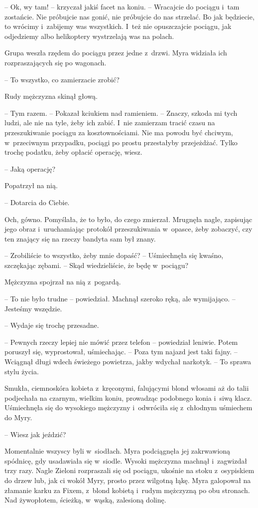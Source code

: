 \documentclass[oneside,polish,11pt,sfheadings]{mwbk}
\begin{document}
-- Ok, wy tam! -- krzyczał jakiś facet na koniu. -- Wracajcie do pociągu i~tam zostańcie. Nie próbujcie nas gonić, nie próbujcie do nas strzelać.
Bo jak będziecie, to wrócimy i~zabijemy was wszystkich. I~też nie
opuszczajcie pociągu, jak odjedziemy albo helikoptery wystrzelają was na
polach.

Grupa weszła rzędem do pociągu przez jedne z~drzwi. Myra widziała ich
rozpraszających się po wagonach.

-- To wszystko, co zamierzacie zrobić?

Rudy mężczyzna skinął głową. 

-- Tym razem. -- Pokazał kciukiem nad
ramieniem. -- Znaczy, szkoda mi tych ludzi, ale nie na tyle, żeby ich
zabić. I~nie zamierzam tracić czasu na przeszukiwanie pociągu za
kosztownościami. Nie ma powodu być chciwym, w~przeciwnym przypadku,
pociągi po prostu przestałyby przejeżdżać. Tylko trochę podatku, żeby
opłacić operację, wiesz.

-- Jaką operację?

Popatrzył na nią. 

-- Dotarcia do Ciebie.

Och, gówno. Pomyślała, że to było, do czego zmierzał. Mrugnęła nagle,
zapisując jego obraz i~uruchamiając protokół przeszukiwania w~opasce,
żeby zobaczyć, czy ten znający się na rzeczy bandyta sam był znany.

-- Zrobiliście to wszystko, żeby mnie dopaść? -- Uśmiechnęła się kwaśno,
szczękając zębami. -- Skąd wiedzieliście, że będę w~pociągu?

Mężczyzna spojrzał na nią z~pogardą. 

-- To nie było trudne -- powiedział.
Machnął szeroko ręką, ale wymijająco. -- Jesteśmy wszędzie.

-- Wydaje się trochę przesadne.

-- Pewnych rzeczy lepiej nie mówić przez telefon -- powiedział leniwie.
Potem poruszył się, wyprostował, uśmiechając. -- Poza tym najazd jest
taki fajny. -- Wciągnął długi wdech świeżego powietrza, jakby wdychał
narkotyk. -- To sprawa stylu życia.

Smukła, ciemnoskóra kobieta z~kręconymi, falującymi blond włosami aż do
talii podjechała na czarnym, wielkim koniu, prowadząc podobnego konia i~siwą klacz. Uśmiechnęła się do wysokiego mężczyzny i~odwróciła się z~chłodnym uśmiechem do Myry.

-- Wiesz jak jeździć?

Momentalnie wszyscy byli w~siodłach. Myra podciągnęła jej zakrwawioną
spódnicę, gdy usadawiała się w~siodle. Wysoki mężczyzna machnął i~zagwizdał trzy razy. Nagle Zieloni rozpraszali się od pociągu, ukośnie
na stoku z~osypiskiem do drzew lub, jak ci wokół Myry, prosto przez
wilgotną łąkę. Myra galopował na złamanie karku za Fixem, z~blond
kobietą i~rudym mężczyzną po obu stronach. Nad żywopłotem, ścieżką, w~wąską, zalesioną dolinę.
\end{document}
